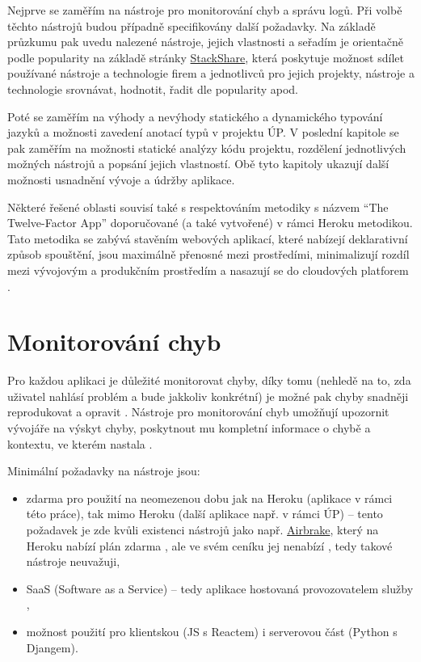 Nejprve se zaměřím na nástroje pro monitorování chyb a správu logů. Při volbě těchto nástrojů budou případně specifikovány další požadavky. Na základě průzkumu pak uvedu nalezené nástroje, jejich vlastnosti a seřadím je orientačně podle popularity na základě stránky \href{https://stackshare.io/}{StackShare}, která poskytuje \cite{stackshare} možnost sdílet používané nástroje a technologie firem a jednotlivců pro jejich projekty, nástroje a technologie srovnávat, hodnotit, řadit dle popularity apod.

Poté se zaměřím na výhody a nevýhody statického a dynamického typování jazyků a možnosti zavedení anotací typů v projektu ÚP. V poslední kapitole se pak zaměřím na možnosti statické analýzy kódu projektu, rozdělení jednotlivých možných nástrojů a popsání jejich vlastností. Obě tyto kapitoly ukazují další možnosti usnadnění vývoje a údržby aplikace.

Některé řešené oblasti souvisí také s respektováním metodiky s názvem \enquote{The Twelve-Factor App} doporučované (a také vytvořené) v rámci Heroku metodikou. Tato metodika se zabývá stavěním webových aplikací, které nabízejí deklarativní způsob spouštění, jsou maximálně přenosné mezi prostředími, minimalizují rozdíl mezi vývojovým a produkčním prostředím a nasazují se do cloudových platforem \cite{12factor}.

\section{Monitorování chyb}\label{sec:monitorovanichyb}
Pro každou aplikaci je důležité monitorovat chyby, díky tomu (nehledě na to, zda uživatel nahlásí problém a bude jakkoliv konkrétní) je možné pak chyby snadněji reprodukovat a opravit \cite{tools-exception}. Nástroje pro monitorování chyb umožňují upozornit vývojáře na výskyt chyby, poskytnout mu kompletní informace o chybě a kontextu, ve kterém nastala \cite{tools-exception}.

Minimální požadavky na nástroje jsou:
\begin{itemize}
    \item zdarma pro použití na neomezenou dobu jak na Heroku (aplikace v rámci této práce), tak mimo Heroku (další aplikace např. v rámci ÚP) -- tento požadavek je zde kvůli existenci nástrojů jako např. \href{https://airbrake.io/}{Airbrake}, který na Heroku nabízí plán zdarma \cite{airbrake-heroku}, ale ve svém ceníku jej nenabízí \cite{airbrake-pricing}, tedy takové nástroje neuvažuji,
    \item SaaS (Software as a Service) -- tedy aplikace hostovaná provozovatelem služby \cite{oracle-saas},
    \item možnost použití pro klientskou (JS s Reactem) i serverovou část (Python s Djangem).
\end{itemize}

